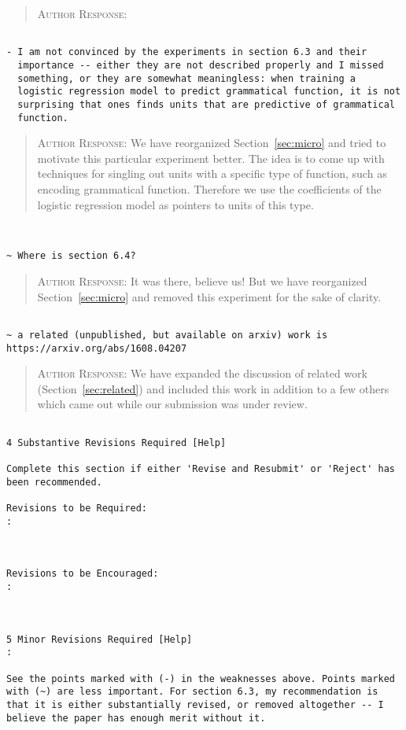 \begin{quote}
\textsc{Author Response:} 
\end{quote}
\begin{verbatim}

- I am not convinced by the experiments in section 6.3 and their
  importance -- either they are not described properly and I missed
  something, or they are somewhat meaningless: when training a
  logistic regression model to predict grammatical function, it is not
  surprising that ones finds units that are predictive of grammatical
  function.
\end{verbatim}  
\begin{quote}
\textsc{Author Response:}  We have reorganized Section~\ref{sec:micro} and 
tried to motivate this particular experiment better. The idea is to 
come up with techniques for singling out units with a specific type
of function, such as encoding grammatical function. Therefore we 
use the coefficients of the logistic regression model as pointers 
to units of this type.
\end{quote}
\begin{verbatim}


~ Where is section 6.4?

\end{verbatim}  
\begin{quote}
\textsc{Author Response:} It was there, believe us! But we have reorganized 
Section~\ref{sec:micro} and removed this experiment for the sake of clarity.
\end{quote}
\begin{verbatim}

~ a related (unpublished, but available on arxiv) work is
https://arxiv.org/abs/1608.04207

\end{verbatim}  
\begin{quote}
\textsc{Author Response:}  We have expanded the discussion of related work 
(Section~\ref{sec:related}) and included this work in addition to a few others which 
came out while our submission was under review.
\end{quote}
\begin{verbatim}

4 Substantive Revisions Required [Help]

Complete this section if either 'Revise and Resubmit' or 'Reject' has
been recommended.

Revisions to be Required:
: 



Revisions to be Encouraged:
: 



5 Minor Revisions Required [Help]
:

See the points marked with (-) in the weaknesses above. Points marked
with (~) are less important. For section 6.3, my recommendation is
that it is either substantially revised, or removed altogether -- I
believe the paper has enough merit without it.

\end{verbatim}  
